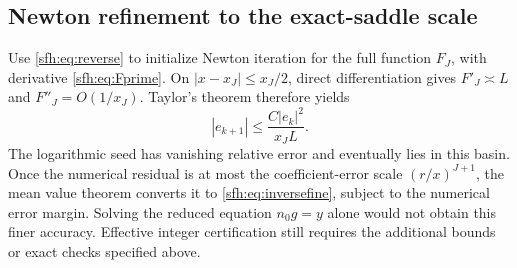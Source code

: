 \subsection{Newton refinement to the exact-saddle scale}
Use \eqref{sfh:eq:reverse} to initialize Newton iteration for the full function $F_J$, with derivative \eqref{sfh:eq:Fprime}. On $|x-x_J|\le x_J/2$, direct differentiation gives $F'_J\asymp L$ and $F''_J=O(1/x_J)$. Taylor's theorem therefore yields
\[
 |e_{k+1}|\le\frac{C|e_k|^2}{x_JL}.
\]
The logarithmic seed has vanishing relative error and eventually lies in this basin. Once the numerical residual is at most the coefficient-error scale $(r/x)^{J+1}$, the mean value theorem converts it to \eqref{sfh:eq:inversefine}, subject to the numerical error margin. Solving the reduced equation $n_0g=y$ alone would not obtain this finer accuracy. Effective integer certification still requires the additional bounds or exact checks specified above.

